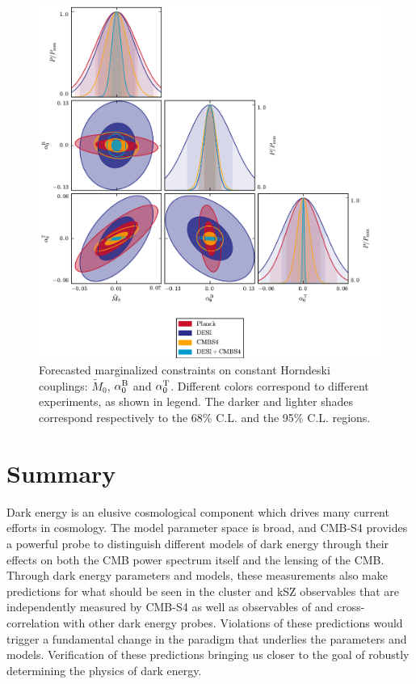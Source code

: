 \begin{figure}[!tb]
\begin{center}
\includegraphics[width=1.0\textwidth]{DarkEnergy/7_Const_alpha}
\caption{Forecasted marginalized constraints on constant Horndeski couplings: $\tilde{M}_{0}$, $\alpha^{\rm B}_0$ and $\alpha_0^{\rm T}$. Different colors correspond to different experiments, as shown in legend. The darker and lighter shades correspond respectively to the 68\% C.L. and the 95\% C.L. regions.}\label{fig:ConstantAlpha}
\end{center}
\end{figure}

\section{Summary}
Dark energy is an elusive cosmological component which drives many current efforts in cosmology. The model parameter space is broad, and CMB-S4 provides a powerful probe to distinguish different models of dark energy through their effects on both the CMB power spectrum itself and the lensing of the CMB.
Through dark energy parameters and models, these measurements also make predictions for what should be seen in the cluster and kSZ observables 
that are independently measured by CMB-S4 as well as observables of and cross-correlation with other dark energy probes.   
Violations of these predictions would trigger a fundamental change in the paradigm that underlies
the parameters and models.  Verification of these predictions bringing us closer to the goal of 
robustly determining the physics of dark energy.

%



